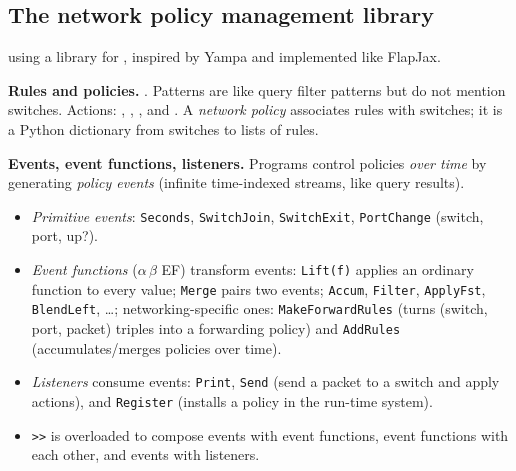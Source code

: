 \subsection{The network policy management library}
 using a library for , inspired by Yampa and implemented like FlapJax.

\textbf{Rules and policies.} .  Patterns are like query filter patterns but do not mention switches. Actions: , , , and .  A \emph{network policy} associates rules with switches; it is a Python dictionary from switches to lists of rules.

\textbf{Events, event functions, listeners.} Programs control policies \emph{over time} by generating \emph{policy events} (infinite time-indexed streams, like query results).
\begin{itemize}
\item \emph{Primitive events}: \texttt{Seconds}, \texttt{SwitchJoin}, \texttt{SwitchExit}, \texttt{PortChange} (switch, port, up?).
\item \emph{Event functions} ($\alpha\,\beta$ \textsf{EF}) transform events: \texttt{Lift(f)} applies an ordinary function to every value; \texttt{Merge} pairs two events; \texttt{Accum}, \texttt{Filter}, \texttt{ApplyFst}, \texttt{BlendLeft}, \ldots; networking-specific ones: \texttt{MakeForwardRules} (turns (switch, port, packet) triples into a forwarding policy) and \texttt{AddRules} (accumulates/merges policies over time).
\item \emph{Listeners} consume events: \texttt{Print}, \texttt{Send} (send a packet to a switch and apply actions), and \texttt{Register} (installs a policy in the run-time system).
\item \texttt{>>} is overloaded to compose events with event functions, event functions with each other, and events with listeners.
\end{itemize}

